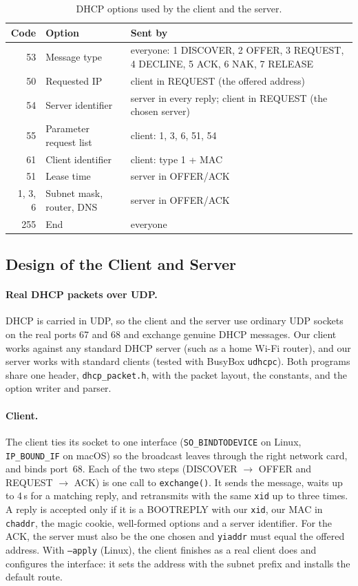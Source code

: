 \documentclass[11pt]{article}
\begin{document}
\begin{table}[H]
\centering
\small
\begin{tabular}{rlp{8.6cm}}
\toprule
\textbf{Code} & \textbf{Option} & \textbf{Sent by} \\
\midrule
53  & Message type & everyone: 1 DISCOVER, 2 OFFER, 3 REQUEST, 4 DECLINE, 5 ACK, 6 NAK,
                     7 RELEASE \\
50  & Requested IP & client in REQUEST (the offered address) \\
54  & Server identifier & server in every reply; client in REQUEST (the chosen server) \\
55  & Parameter request list & client: 1, 3, 6, 51, 54 \\
61  & Client identifier & client: type 1 + MAC \\
51  & Lease time & server in OFFER/ACK \\
1, 3, 6 & Subnet mask, router, DNS & server in OFFER/ACK \\
255 & End & everyone \\
\bottomrule
\end{tabular}
\caption{DHCP options used by the client and the server.}
\label{tab:options}
\end{table}

\subsection{Design of the Client and Server}
\paragraph{Real DHCP packets over UDP.} DHCP is carried in UDP, so the client and the server
use ordinary UDP sockets on the real ports 67 and 68 and exchange
genuine DHCP messages. Our client works against any standard DHCP server (such as a home
Wi-Fi router), and our server works with standard clients (tested with BusyBox
\texttt{udhcpc}). Both programs share one header, \texttt{dhcp\_packet.h}, with the packet
layout, the constants, and the option writer and parser.

\paragraph{Client.} The client ties its socket to one interface (\texttt{SO\_BINDTODEVICE}
on Linux, \texttt{IP\_BOUND\_IF} on macOS) so the broadcast leaves through the right
network card, and binds port~68. Each of the two steps (DISCOVER $\to$ OFFER and REQUEST
$\to$ ACK) is one call to \texttt{exchange()}. It sends the message, waits up to 4\,s for a
matching reply, and retransmits with the same \texttt{xid} up to three times. A reply is
accepted only if it is a BOOTREPLY with our \texttt{xid}, our MAC in \texttt{chaddr}, the
magic cookie, well-formed options and a server identifier. For the ACK, the server must
also be the one chosen and \texttt{yiaddr} must equal the offered address. With
\texttt{--apply} (Linux), the client finishes as a real client does and configures the
interface: it sets the address with the subnet prefix and installs the default route.
\end{document}
